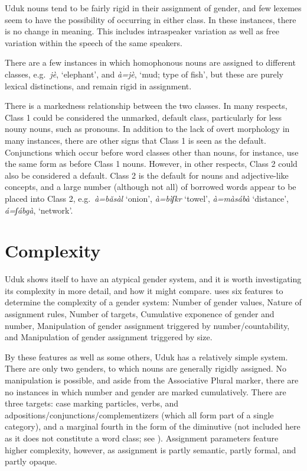 \documentclass[output=collectionpaper,hidelinks]{langscibook}
\theoremstyle{remark}
\begin{document}
Uduk nouns tend to be fairly rigid in their assignment of gender, and few
lexemes seem to have the possibility of occurring in either class. In these
instances, there is no change in meaning. This includes intraspeaker variation
as well as free variation within the speech of the same speakers.

There are a few instances in which homophonous nouns are assigned to different
classes, e.g.\ \emph{jè}, `elephant', and \emph{à=jè}, `mud; type of fish',
but these are purely lexical distinctions, and remain rigid in assignment.

There is a markedness relationship between the two classes. In many respects,
Class 1 could be considered the unmarked, default class, particularly for less
nouny nouns, such as pronouns. In addition to the lack of overt morphology in
many instances, there are other signs that Class 1 is seen as the default.
Conjunctions which occur before word classes other than nouns, for instance, use
the same form as before Class 1 nouns.
However, in other respects, Class 2 could also be considered a default.  Class 2
is the default for nouns and adjective-like concepts, and a large number
(although not all) of borrowed words appear to be placed into Class 2, e.g.\
\emph{à=bǎsàl} `onion', \emph{à=bìʃk\iLowMid{}\hspace*{-0.6mm}r} `towel',
\emph{à=màsábà} `distance', \emph{á=ʃáb\aLowMid{}\hspace*{-.4mm}gà},
`network'.

\section{Complexity}
\label{sec:Complexity}

Uduk shows itself to have an atypical gender system, and it is worth
investigating its complexity in more detail, and how it might compare.
\citet[183]{DiGarbo2014} uses six features to determine the
complexity of a gender system: Number of gender values, Nature of assignment
rules, Number of targets, Cumulative exponence of gender and number,
Manipulation of gender assignment triggered by number/countability, and
Manipulation of gender assignment triggered by size.

By these features as well as some others, Uduk has a relatively
simple system. There are only two genders, to which nouns are generally rigidly
assigned. No manipulation is possible, and aside from the Associative Plural
marker, there are no instances in which number and gender are marked
cumulatively. There are three targets: case marking particles, verbs, and
adpositions/conjunctions/complementizers (which all form part of a single
category), and a marginal fourth in the form of the diminutive (not included
here as it does not constitute a word class; see ). Assignment parameters feature
higher complexity, however, as assignment is partly semantic, partly formal, and
partly opaque.
\end{document}

